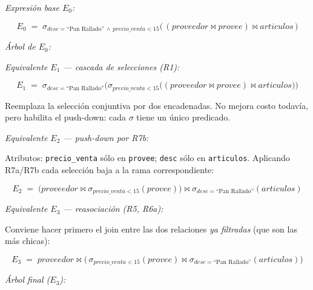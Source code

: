 \documentclass[11pt,a4paper]{article}
\newcommand{\sel}[1]{\sigma_{#1}}
\newcommand{\jn}{\bowtie}
\begin{document}
\textit{Expresión base $E_0$:}

\[
E_0 \;=\; \sel{desc=\text{``Pan Rallado''}\,\wedge\, precio\_venta<15}\!\!\big(
\,(proveedor \jn provee) \jn articulos\,\big)
\]

\textit{Árbol de $E_0$:}

\begin{center}
\end{center}

\textit{Equivalente $E_1$ --- cascada de selecciones (R1):}

\[
E_1 \;=\; \sel{desc=\text{``Pan Rallado''}}\!\big(
\sel{precio\_venta<15}\!\big((proveedor\jn provee)\jn articulos\big)\big)
\]

Reemplaza la selección conjuntiva por dos encadenadas. No mejora costo todavía, pero habilita el push-down: cada $\sigma$ tiene un único predicado.

\textit{Equivalente $E_2$ --- push-down por R7b:}

Atributos: \texttt{precio\_venta} sólo en \texttt{provee}; \texttt{desc} sólo en \texttt{articulos}. Aplicando R7a/R7b cada selección baja a la rama correspondiente:

\[
E_2 \;=\; \big(proveedor \jn \sel{precio\_venta<15}(provee)\big)
        \jn \sel{desc=\text{``Pan Rallado''}}(articulos)
\]

\textit{Equivalente $E_3$ --- reasociación (R5, R6a):}

Conviene hacer primero el join entre las dos relaciones \emph{ya filtradas} (que son las más chicas):

\[
E_3 \;=\; proveedor \jn \big(\,
\sel{precio\_venta<15}(provee) \jn \sel{desc=\text{``Pan Rallado''}}(articulos)
\big)
\]

\textit{Árbol final ($E_3$):}

\begin{center}
\end{center}
\end{document}
